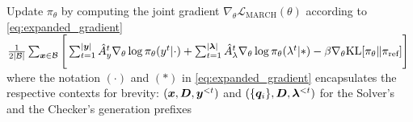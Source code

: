 \documentclass[10pt, a4paper, logo]{googledeepmind} %
\begin{document}
\begin{algorithm*}[!t]
Update $\pi_\theta$ by computing the joint gradient $\nabla_\theta \mathcal{L}_{\text{MARCH}}(\theta)$ according to \eqref{eq:expanded_gradient}\:
$    \frac{1}{2|{\mathcal{B}}|} \sum_{{\bm{x}} \in \mathcal{B}} \Bigg[\sum_{t=1}^{|{\bm{y}}|} \hat{A}_{y}^t  \nabla_\theta \log \pi_\theta({y}^t | \cdot) +\sum_{t=1}^{|\bm{\lambda}|} \hat{A}_{\lambda}^t   \nabla_\theta \log \pi_\theta({\lambda}^t | *) - \beta \nabla_\theta \text{KL}[\pi_\theta \| \pi_{\text{ref}}] \Bigg]$\;
where the notation $(\cdot)$ and $(*)$ in \eqref{eq:expanded_gradient} encapsulates the respective contexts for brevity: $({\bm{x}}, {\bm{D}}, {\bm{y}}^{<t})$ and $(\{{\bm{q}}_i\}, {\bm{D}}, \bm{\lambda}^{<t})$ for the Solver's and the Checker's generation prefixes\;
\caption{MARCH Training Process.}
\label{alg:training}
\end{algorithm*}

\end{document}
